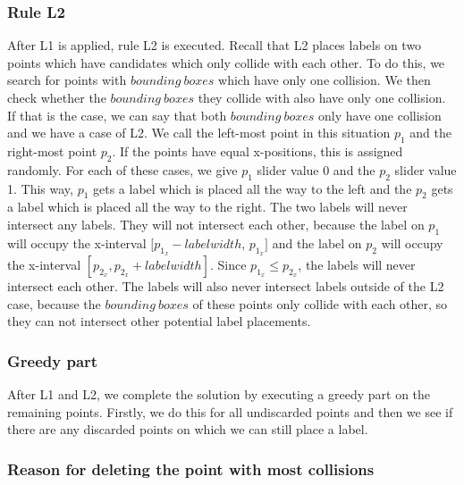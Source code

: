 \documentclass[crop=false,a4paper,oneside,11pt]{article}
\begin{document}
\subsubsection{Rule L2}
After L1 is applied, rule L2 is executed. Recall that L2 places labels on two points which have candidates which only collide with each other. To do this, we search for points with $bounding \ boxes$ which have only one collision. We then check whether the $bounding \ boxes$ they collide with also have only one collision. If that is the case, we can say that both $bounding \ boxes$ only have one collision and we have a case of L2. We call the left-most point in this situation $p_1$ and the right-most point $p_2$. If the points have equal x-positions, this is assigned randomly. For each of these cases, we give $p_1$ slider value 0 and the $p_2$ slider value 1. This way, $p_1$ gets a label which is placed all the way to the left and the $p_2$ gets a label which is placed all the way to the right. The two labels will never intersect any labels. They will not intersect each other, because the label on $p_1$ will occupy the x-interval $[p_{1_x} - labelwidth$, $p_{1_x}]$ and the label on $p_2$ will occupy the x-interval $[p_{2_x}, p_{2_x} + labelwidth]$. Since $p_{1_x} \leq p_{2_x}$, the labels will never intersect each other. The labels will also never intersect labels outside of the L2 case, because the $bounding \ boxes$ of these points only collide with each other, so they can not intersect other potential label placements.
\subsubsection{Greedy part}
After L1 and L2, we complete the solution by executing a greedy part on the remaining points. Firstly, we do this for all undiscarded points and then we see if there are any discarded points on which we can still place a label.

\subsubsection{Reason for deleting the point with most collisions}
\end{document}
